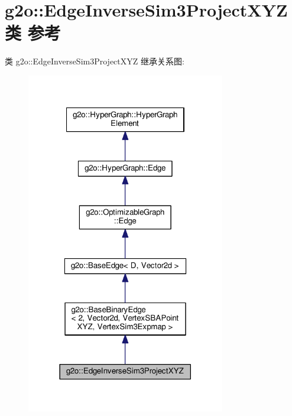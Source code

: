 \hypertarget{classg2o_1_1EdgeInverseSim3ProjectXYZ}{\section{g2o\-:\-:Edge\-Inverse\-Sim3\-Project\-X\-Y\-Z类 参考}
\label{classg2o_1_1EdgeInverseSim3ProjectXYZ}
}


类 g2o\-:\-:Edge\-Inverse\-Sim3\-Project\-X\-Y\-Z 继承关系图\-:
\nopagebreak
\begin{figure}[H]
\begin{center}
\leavevmode
\includegraphics[width=246pt]{classg2o_1_1EdgeInverseSim3ProjectXYZ__inherit__graph}
\end{center}
\end{figure}


